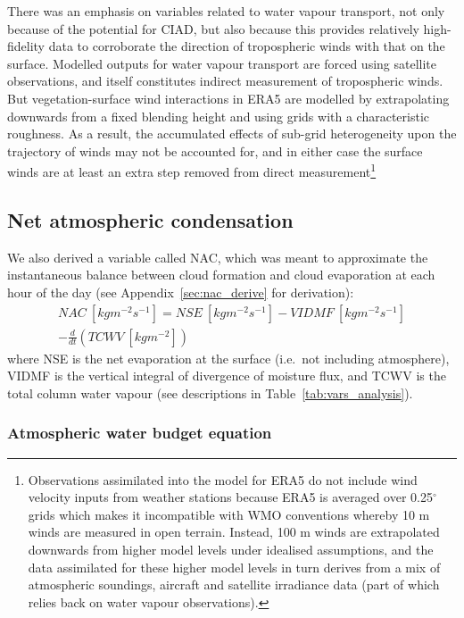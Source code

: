 There was an emphasis on variables related to water vapour transport, not only because of the potential for \ac{CIAD}, but also because this provides relatively high-fidelity data to corroborate the direction of tropospheric winds with that on the surface. Modelled outputs for water vapour transport are forced using satellite observations, and itself constitutes indirect measurement of tropospheric winds. But vegetation-surface wind interactions in ERA5 are modelled by extrapolating downwards from a fixed blending height and using grids with a characteristic roughness. As a result, the accumulated effects of sub-grid heterogeneity upon the trajectory of winds may not be accounted for, and in either case the surface winds are at least an extra step removed from direct measurement\footnote{Observations assimilated into the model for \ac{ERA5} do not include wind velocity inputs from weather stations because \ac{ERA5} is averaged over 0.25$^\circ$ grids which makes it incompatible with \ac{WMO} conventions whereby 10 m winds are measured in open terrain. Instead, 100 m winds are extrapolated downwards from higher model levels under idealised assumptions, and the data assimilated for these higher model levels in turn derives from a mix of atmospheric soundings, aircraft and satellite irradiance data (part of which relies back on water vapour observations).}

\subsection{Net atmospheric condensation}

We also derived a variable called \ac{NAC}, which was meant to approximate the instantaneous balance between cloud formation and cloud evaporation at each hour of the day (see Appendix~\ref{sec:nac_derive} for derivation):
\begin{eqnarray}
	\label{eq:nac}
	NAC \ [kg m^{-2} s^{-1}] = NSE \ [kg m^{-2} s^{-1}] - VIDMF \ [kg m^{-2} s^{-1}] \\ 
	- \frac{d}{dt}(TCWV \ [kg m^{-2}]) \nonumber
\end{eqnarray}
where \acs{NSE} is the net evaporation at the surface (i.e.\ not including atmosphere), \acs{VIDMF} is the vertical integral of divergence of moisture flux, and \acs{TCWV} is the total column water vapour (see descriptions in Table~\ref{tab:vars_analysis}).

\subsubsection{Atmospheric water budget equation}

